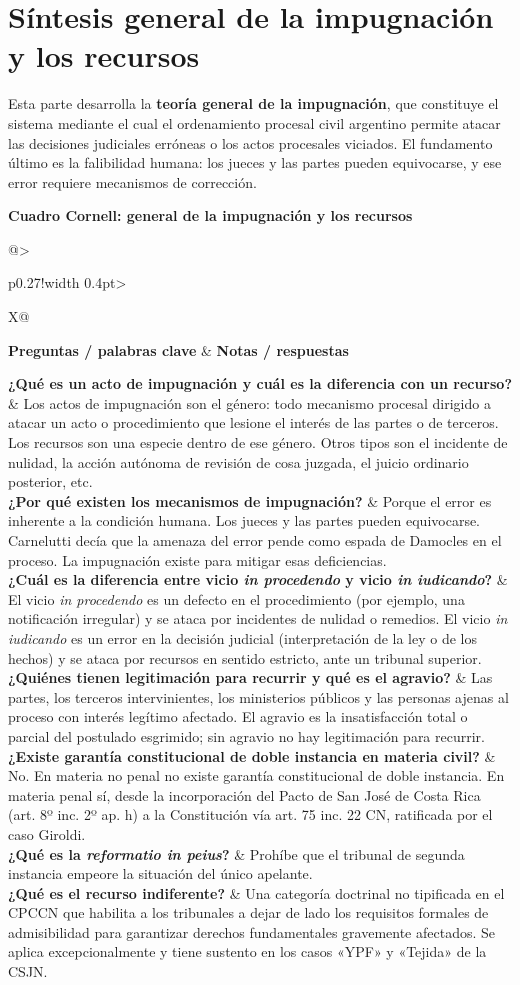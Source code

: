 \documentclass[12pt,oneside]{book}
\makeatletter
\newcommand{\cornelltitle}[1]{\par\bigskip\noindent\textbf{\sffamily Cuadro Cornell: #1}\par\nopagebreak\smallskip}
\newcommand{\cqrow}[2]{\textbf{#1} & #2 \\[0.5em]}
\newcommand{\cornellblock}[1]{%
  \noindent\begin{tabularx}{\textwidth}{@{}>{\raggedright\arraybackslash}p{0.27\textwidth}!{\vrule width 0.4pt}>{\raggedright\arraybackslash}X@{}}
  \toprule
  \textbf{Preguntas / palabras clave} & \textbf{Notas / respuestas} \\
  \midrule
  #1
  \bottomrule
  \end{tabularx}\par}
\makeatother
\begin{document}
\section{Síntesis general de la impugnación y los recursos}

\begin{important}
Esta parte desarrolla la \textbf{teoría general de la impugnación}, que constituye el sistema mediante el cual el ordenamiento procesal civil argentino permite atacar las decisiones judiciales erróneas o los actos procesales viciados. El fundamento último es la falibilidad humana: los jueces y las partes pueden equivocarse, y ese error requiere mecanismos de corrección.
\end{important}

\cornelltitle{general de la impugnación y los recursos}
\cornellblock{
\cqrow{¿Qué es un acto de impugnación y cuál es la diferencia con un recurso?}{Los actos de impugnación son el género: todo mecanismo procesal dirigido a atacar un acto o procedimiento que lesione el interés de las partes o de terceros. Los recursos son una especie dentro de ese género. Otros tipos son el incidente de nulidad, la acción autónoma de revisión de cosa juzgada, el juicio ordinario posterior, etc.
}
\cqrow{¿Por qué existen los mecanismos de impugnación?}{Porque el error es inherente a la condición humana. Los jueces y las partes pueden equivocarse. Carnelutti decía que la amenaza del error pende como espada de Damocles en el proceso. La impugnación existe para mitigar esas deficiencias.
}
\cqrow{¿Cuál es la diferencia entre vicio \textit{in procedendo} y vicio \textit{in iudicando}?}{El vicio \textit{in procedendo} es un defecto en el procedimiento (por ejemplo, una notificación irregular) y se ataca por incidentes de nulidad o remedios. El vicio \textit{in iudicando} es un error en la decisión judicial (interpretación de la ley o de los hechos) y se ataca por recursos en sentido estricto, ante un tribunal superior.
}
\cqrow{¿Quiénes tienen legitimación para recurrir y qué es el agravio?}{Las partes, los terceros intervinientes, los ministerios públicos y las personas ajenas al proceso con interés legítimo afectado. El agravio es la insatisfacción total o parcial del postulado esgrimido; sin agravio no hay legitimación para recurrir.
}
\cqrow{¿Existe garantía constitucional de doble instancia en materia civil?}{No. En materia no penal no existe garantía constitucional de doble instancia. En materia penal sí, desde la incorporación del Pacto de San José de Costa Rica (art. 8º inc. 2º ap. h) a la Constitución vía art. 75 inc. 22 CN, ratificada por el caso Giroldi.
}
\cqrow{¿Qué es la \textit{reformatio in peius}?}{Prohíbe que el tribunal de segunda instancia empeore la situación del único apelante.
}
\cqrow{¿Qué es el recurso indiferente?}{Una categoría doctrinal no tipificada en el CPCCN que habilita a los tribunales a dejar de lado los requisitos formales de admisibilidad para garantizar derechos fundamentales gravemente afectados. Se aplica excepcionalmente y tiene sustento en los casos «YPF» y «Tejida» de la CSJN.
}
}
\end{document}
